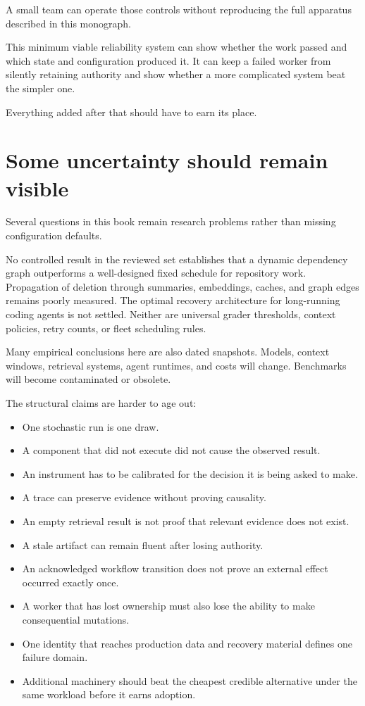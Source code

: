 A small team can operate those controls without reproducing the full apparatus described in this monograph.

This minimum viable reliability system can show whether the work passed and which state and configuration produced it. It can keep a failed worker from silently retaining authority and show whether a more complicated system beat the simpler one.

Everything added after that should have to earn its place.

\hypertarget{some-uncertainty-should-remain-visible}{%
\section{Some uncertainty should remain visible}\label{some-uncertainty-should-remain-visible}}

Several questions in this book remain research problems rather than missing configuration defaults.

No controlled result in the reviewed set establishes that a dynamic dependency graph outperforms a well-designed fixed schedule for repository work. Propagation of deletion through summaries, embeddings, caches, and graph edges remains poorly measured. The optimal recovery architecture for long-running coding agents is not settled. Neither are universal grader thresholds, context policies, retry counts, or fleet scheduling rules.

Many empirical conclusions here are also dated snapshots. Models, context windows, retrieval systems, agent runtimes, and costs will change. Benchmarks will become contaminated or obsolete.

The structural claims are harder to age out:

\begin{itemize}
\tightlist
\item
  One stochastic run is one draw.
\item
  A component that did not execute did not cause the observed result.
\item
  An instrument has to be calibrated for the decision it is being asked to make.
\item
  A trace can preserve evidence without proving causality.
\item
  An empty retrieval result is not proof that relevant evidence does not exist.
\item
  A stale artifact can remain fluent after losing authority.
\item
  An acknowledged workflow transition does not prove an external effect occurred exactly once.
\item
  A worker that has lost ownership must also lose the ability to make consequential mutations.
\item
  One identity that reaches production data and recovery material defines one failure domain.
\item
  Additional machinery should beat the cheapest credible alternative under the same workload before it earns adoption.
\end{itemize}

